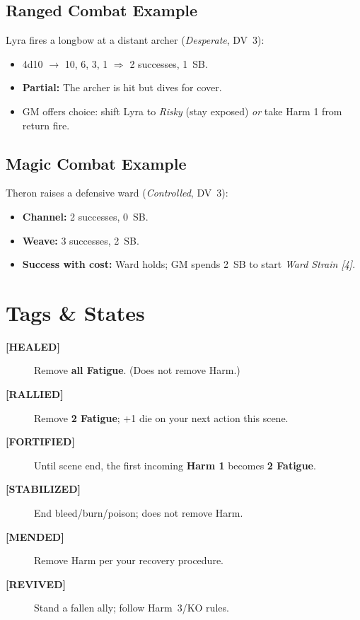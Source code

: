 \subsection{Ranged Combat Example}
\label{subsec:ranged-example}
Lyra fires a longbow at a distant archer (\textit{Desperate}, DV~3):
\begin{itemize}
  \item 4d10 $\rightarrow$ 10, 6, 3, 1 $\Rightarrow$ 2 successes, 1~SB.
  \item \textbf{Partial:} The archer is hit but dives for cover.
  \item GM offers choice: shift Lyra to \textit{Risky} (stay exposed) \emph{or} take Harm 1 from return fire.
\end{itemize}

\subsection{Magic Combat Example}
\label{subsec:magic-example}
Theron raises a defensive ward (\textit{Controlled}, DV~3):
\begin{itemize}
  \item \textbf{Channel:} 2 successes, 0~SB.
  \item \textbf{Weave:} 3 successes, 2~SB.
  \item \textbf{Success with cost:} Ward holds; GM spends 2~SB to start \emph{Ward Strain [4]}.
\end{itemize}

\section{Tags \& States}
\label{sec:tags-states-ref}
\begin{description}
  \item[\textbf{[HEALED]}] Remove \textbf{all Fatigue}. (Does not remove Harm.)
  \item[\textbf{[RALLIED]}] Remove \textbf{2 Fatigue}; +1 die on your next action this scene.
  \item[\textbf{[FORTIFIED]}] Until scene end, the first incoming \textbf{Harm 1} becomes \textbf{2 Fatigue}.
  \item[\textbf{[STABILIZED]}] End bleed/burn/poison; does not remove Harm.
  \item[\textbf{[MENDED]}] Remove Harm per your recovery procedure.
  \item[\textbf{[REVIVED]}] Stand a fallen ally; follow Harm~3/KO rules.
\end{description}

